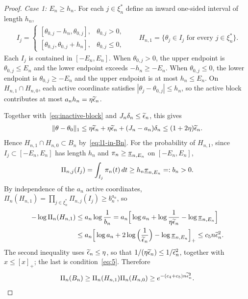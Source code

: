 \begin{proof}
\smallskip\noindent\emph{Case 1: $E_n\geq h_n$.}
For each $j\in\xi_n^*$ define an inward one-sided interval of length $h_n$,
\begin{align*}
I_j=
\begin{cases}
[\theta_{0,j}-h_n,\theta_{0,j}],&\theta_{0,j}>0,\\
[\theta_{0,j},\theta_{0,j}+h_n],&\theta_{0,j}\leq0,
\end{cases}
\qquad
H_{n,1}=\{\theta_j\in I_j\text{ for every }j\in\xi_n^*\}.
\end{align*}
Each $I_j$ is contained in $[-E_n,E_n]$. When $\theta_{0,j}>0$, the upper endpoint is $\theta_{0,j}\leq E_n$ and the lower endpoint exceeds $-h_n\geq-E_n$. When $\theta_{0,j}\leq0$, the lower endpoint is $\theta_{0,j}\geq-E_n$ and the upper endpoint is at most $h_n\leq E_n$. On $H_{n,1}\cap H_{n,0}$, each active coordinate satisfies $|\theta_j-\theta_{0,j}|\leq h_n$, so the active block contributes at most $a_nh_n=\eta\widetilde{\epsilon}_n$.

Together with~\eqref{eq:inactive-block} and $J_n\delta_n\leq\widetilde{\epsilon}_n$, this gives
\begin{align*}
\|\theta-\theta_0\|_1
\leq\eta\widetilde{\epsilon}_n+\eta\widetilde{\epsilon}_n+(J_n-a_n)\delta_n
\leq(1+2\eta)\widetilde{\epsilon}_n .
\end{align*}
Hence $H_{n,1}\cap H_{n,0}\subset B_n$ by~\eqref{eq:l1-in-Bn}. For the probability of $H_{n,1}$, since $I_j\subset[-E_n,E_n]$ has length $h_n$ and $\pi_n\geq\underline{\pi}_{n,E_n}$ on $[-E_n,E_n]$,
\begin{align*}
\Pi_{n,j}(I_j)=\int_{I_j}\pi_n(t)\,dt\geq h_n\underline{\pi}_{n,E_n}=:b_n>0 .
\end{align*}
By independence of the $a_n$ active coordinates, $\Pi_n(H_{n,1})=\prod_{j\in\xi_n^*}\Pi_{n,j}(I_j)\geq b_n^{a_n}$, so
\begin{align*}
-\log\Pi_n(H_{n,1})
&\leq a_n\log\frac1{b_n}
=a_n\Big[\log a_n+\log\frac1{\eta\widetilde{\epsilon}_n}-\log\underline{\pi}_{n,E_n}\Big]\\
&\leq a_n\Big[\log a_n+2\log\Big(\frac1{\widetilde{\epsilon}_n}\Big)-\log\underline{\pi}_{n,E_n}\Big]_+
\leq c_5n\widetilde{\epsilon}_n^2 .
\end{align*}
The second inequality uses $\widetilde{\epsilon}_n\leq\eta$, so that $1/(\eta\widetilde{\epsilon}_n)\leq1/\widetilde{\epsilon}_n^2$, together with $x\leq[x]_+$; the last is condition~\eqref{eq:5}. Therefore
\begin{align*}
\Pi_n(B_n)\geq\Pi_n(H_{n,1})\Pi_n(H_{n,0})\geq e^{-(c_4+c_5)n\widetilde{\epsilon}_n^2}.
\end{align*}


\end{proof}

